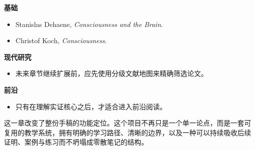 \begin{readingbox}
\textbf{基础}
\begin{itemize}[nosep]
  \item Stanislas Dehaene, \emph{Consciousness and the Brain}.
  \item Christof Koch, \emph{Consciousness}.
\end{itemize}
\textbf{现代研究}
\begin{itemize}[nosep]
  \item 未来章节继续扩展前，应先使用分级文献地图来精确筛选论文。
\end{itemize}
\textbf{前沿}
\begin{itemize}[nosep]
  \item 只有在理解实证核心之后，才适合进入前沿阅读。
\end{itemize}
\end{readingbox}

\begin{summarybox}
这一章改变了整份手稿的功能定位。这个项目不再只是一个单一论点，而是一套可复用的教学系统，拥有明确的学习路径、清晰的边界，以及一种可以持续吸收后续证明、案例与练习而不坍塌成零散笔记的结构。
\end{summarybox}
